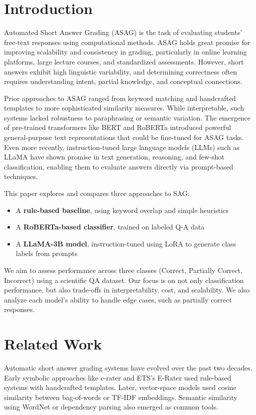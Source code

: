 \documentclass[11pt]{article}
\begin{document}
\section{Introduction}
Automated Short Answer Grading (ASAG) is the task of evaluating students’ free-text responses using computational methods. ASAG holds great promise for improving scalability and consistency in grading, particularly in online learning platforms, large lecture courses, and standardized assessments. However, short answers exhibit high linguistic variability, and determining correctness often requires understanding intent, partial knowledge, and conceptual connections.

Prior approaches to ASAG ranged from keyword matching and handcrafted templates to more sophisticated similarity measures. While interpretable, such systems lacked robustness to paraphrasing or semantic variation. The emergence of pre-trained transformers like BERT and RoBERTa introduced powerful general-purpose text representations that could be fine-tuned for ASAG tasks. Even more recently, instruction-tuned large language models (LLMs) such as LLaMA have shown promise in text generation, reasoning, and few-shot classification, enabling them to evaluate answers directly via prompt-based techniques.

This paper explores and compares three approaches to SAG:
\begin{itemize}
    \item A \textbf{rule-based baseline}, using keyword overlap and simple heuristics
    \item A \textbf{RoBERTa-based classifier}, trained on labeled Q-A data
    \item A \textbf{LLaMA-3B model}, instruction-tuned using LoRA to generate class labels from prompts
\end{itemize}

We aim to assess performance across three classes (Correct, Partially Correct, Incorrect) using a scientific QA dataset. Our focus is on not only classification performance, but also trade-offs in interpretability, cost, and scalability. We also analyze each model’s ability to handle edge cases, such as partially correct responses.

\section{Related Work}
Automatic short answer grading systems have evolved over the past two decades. Early symbolic approaches like c-rater and ETS's E-Rater used rule-based systems with handcrafted templates. Later, vector-space models used cosine similarity between bag-of-words or TF-IDF embeddings. Semantic similarity using WordNet or dependency parsing also emerged as common tools.
\end{document}
